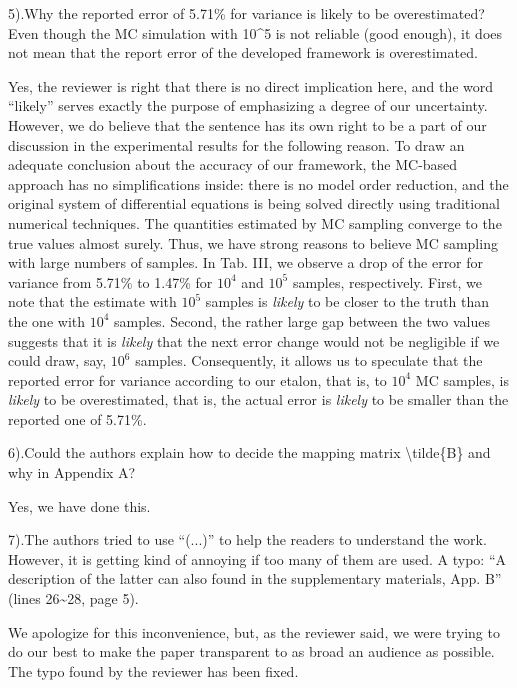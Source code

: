 \begin{reviewer}
5).Why the reported error of 5.71\% for variance is likely to be overestimated? Even though the MC simulation with 10\^{}5 is not reliable (good enough), it does not mean that the report error of the developed framework is overestimated.
\end{reviewer}
\begin{authors}
Yes, the reviewer is right that there is no direct implication here, and the word ``likely''  serves exactly the purpose of emphasizing a degree of our uncertainty.
However, we do believe that the sentence has its own right to be a part of our discussion in the experimental results for the following reason.
To draw an adequate conclusion about the accuracy of our framework, the MC-based approach has no simplifications inside: there is no model order reduction, and the original system of differential equations is being solved directly using traditional numerical techniques.
The quantities estimated by MC sampling converge to the true values almost surely.
Thus, we have strong reasons to believe MC sampling with large numbers of samples.
In Tab. III, we observe a drop of the error for variance from 5.71\% to 1.47\% for $10^4$ and $10^5$ samples, respectively.
First, we note that the estimate with $10^5$ samples is \emph{likely} to be closer to the truth than the one with $10^4$ samples.
Second, the rather large gap between the two values suggests that it is \emph{likely} that the next error change would not be negligible if we could draw, say, $10^6$ samples.
Consequently, it allows us to speculate that the reported error for variance according to our etalon, that is, to $10^4$ MC samples, is \emph{likely} to be overestimated, that is, the actual error is \emph{likely} to be smaller than the reported one of 5.71\%.
\end{authors}

\begin{reviewer}
6).Could the authors explain how to decide the mapping matrix \textbackslash{}tilde\{B\} and why in Appendix A?
\end{reviewer}
\begin{authors}
Yes, we have done this.
\end{authors}

\begin{reviewer}
7).The authors tried to use  ``(...)'' to help the readers to understand the work. However, it is getting kind of annoying if too many of them are used. A typo: ``A description of the latter can also found in the supplementary materials, App. B'' (lines 26\~{}28, page 5).
\end{reviewer}
\begin{authors}
We apologize for this inconvenience, but, as the reviewer said, we were trying to do our best to make the paper transparent to as broad an audience as possible.
The typo found by the reviewer has been fixed.
\end{authors}

